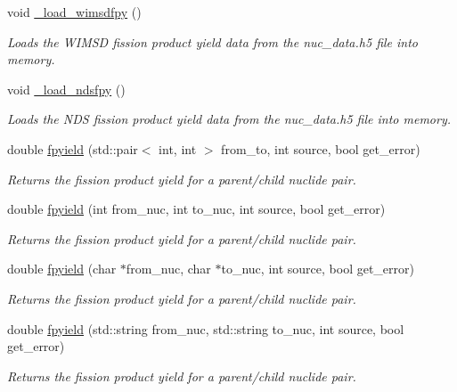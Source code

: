 \begin{DoxyCompactItemize}
\item 
\mbox{\label{namespacepyne_a32682c82d07a8370677923550dbc9904}} 
void \hyperlink{namespacepyne_a32682c82d07a8370677923550dbc9904}{\+\_\+load\+\_\+wimsdfpy} ()
\begin{DoxyCompactList}\small\item\em Loads the W\+I\+M\+SD fission product yield data from the nuc\+\_\+data.\+h5 file into memory. \end{DoxyCompactList}\item 
\mbox{\label{namespacepyne_af936ac3eb775e52c0bc7df8fbd248a66}} 
void \hyperlink{namespacepyne_af936ac3eb775e52c0bc7df8fbd248a66}{\+\_\+load\+\_\+ndsfpy} ()
\begin{DoxyCompactList}\small\item\em Loads the N\+DS fission product yield data from the nuc\+\_\+data.\+h5 file into memory. \end{DoxyCompactList}\item 
double \hyperlink{namespacepyne_aff6ebb85fad0e8c4001fcfef4d334c8c}{fpyield} (std\+::pair$<$ int, int $>$ from\+\_\+to, int source, bool get\+\_\+error)
\begin{DoxyCompactList}\small\item\em Returns the fission product yield for a parent/child nuclide pair. \end{DoxyCompactList}\item 
\mbox{\label{namespacepyne_a0524d0aa3b138fe9275dde433d046fbf}} 
double \hyperlink{namespacepyne_a0524d0aa3b138fe9275dde433d046fbf}{fpyield} (int from\+\_\+nuc, int to\+\_\+nuc, int source, bool get\+\_\+error)
\begin{DoxyCompactList}\small\item\em Returns the fission product yield for a parent/child nuclide pair. \end{DoxyCompactList}\item 
\mbox{\label{namespacepyne_a3228e21aa31a43ffbf2394f7c6dba392}} 
double \hyperlink{namespacepyne_a3228e21aa31a43ffbf2394f7c6dba392}{fpyield} (char $\ast$from\+\_\+nuc, char $\ast$to\+\_\+nuc, int source, bool get\+\_\+error)
\begin{DoxyCompactList}\small\item\em Returns the fission product yield for a parent/child nuclide pair. \end{DoxyCompactList}\item 
\mbox{\label{namespacepyne_af51092b1f4dd0ac7c5f52df8b3cb33d5}} 
double \hyperlink{namespacepyne_af51092b1f4dd0ac7c5f52df8b3cb33d5}{fpyield} (std\+::string from\+\_\+nuc, std\+::string to\+\_\+nuc, int source, bool get\+\_\+error)
\begin{DoxyCompactList}\small\item\em Returns the fission product yield for a parent/child nuclide pair. \end{DoxyCompactList}\end{DoxyCompactItemize}
